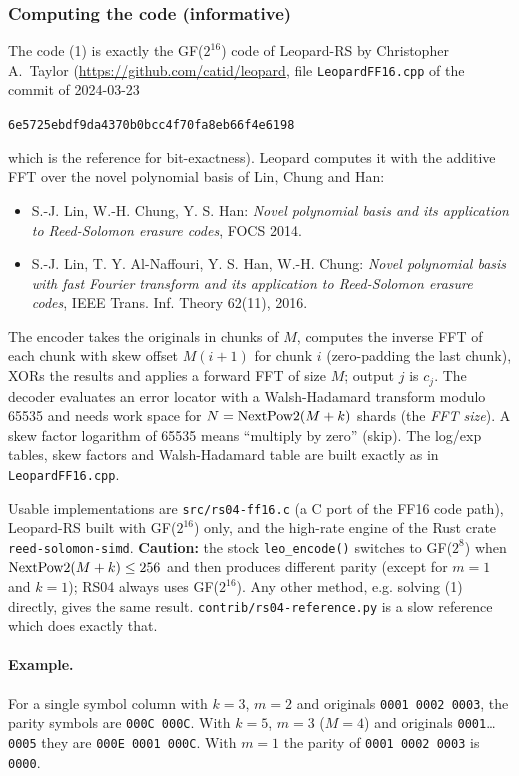 \subsubsection{Computing the code (informative)}

The code (1) is exactly the GF($2^{16}$) code of Leopard-RS by Christopher
A.\ Taylor (\url{https://github.com/catid/leopard}, file
{\tt LeopardFF16.cpp} of the commit of 2024-03-23

\centerline{\tt 6e5725ebdf9da4370b0bcc4f70fa8eb66f4e6198}

which is the reference for bit-exactness). Leopard computes it with the
additive FFT over the novel polynomial basis of Lin, Chung and Han:

\begin{itemize}
\item S.-J. Lin, W.-H. Chung, Y. S. Han: {\em Novel polynomial basis and its
  application to Reed-Solomon erasure codes}, FOCS 2014.
\item S.-J. Lin, T. Y. Al-Naffouri, Y. S. Han, W.-H. Chung: {\em Novel
  polynomial basis with fast Fourier transform and its application to
  Reed-Solomon erasure codes}, IEEE Trans. Inf. Theory 62(11), 2016.
\end{itemize}

The encoder takes the originals in chunks of $M$, computes the inverse FFT
of each chunk with skew offset $M(i+1)$ for chunk $i$ (zero-padding the last
chunk), XORs the results and applies a forward FFT of size $M$; output $j$
is $c_j$. The decoder evaluates an error locator with a Walsh-Hadamard
transform modulo 65535 and needs work space for
$N = {\rm NextPow2}(M + k)$ shards (the {\em FFT size}). A skew factor
logarithm of 65535 means ``multiply by zero'' (skip). The log/exp tables,
skew factors and Walsh-Hadamard table are built exactly as in
{\tt LeopardFF16.cpp}.

\medskip

Usable implementations are {\tt src/rs04-ff16.c} (a C port of the FF16 code
path), Leopard-RS built with GF($2^{16}$) only, and the high-rate engine of
the Rust crate {\tt reed-solomon-simd}. {\bf Caution:} the stock
{\tt leo\_encode()} switches to GF($2^8$) when
${\rm NextPow2}(M+k) \le 256$ and then produces different parity (except for
$m = 1$ and $k = 1$); RS04 always uses GF($2^{16}$). Any other method, e.g.
solving (1) directly, gives the same result. {\tt contrib/rs04-reference.py}
is a slow reference which does exactly that.

\paragraph{Example.} For a single symbol column with $k = 3$, $m = 2$ and
originals {\tt 0001 0002 0003}, the parity symbols are {\tt 000C 000C}.
With $k = 5$, $m = 3$ ($M = 4$) and originals {\tt 0001}\ldots{\tt 0005}
they are {\tt 000E 0001 000C}. With $m = 1$ the parity of
{\tt 0001 0002 0003} is {\tt 0000}.

